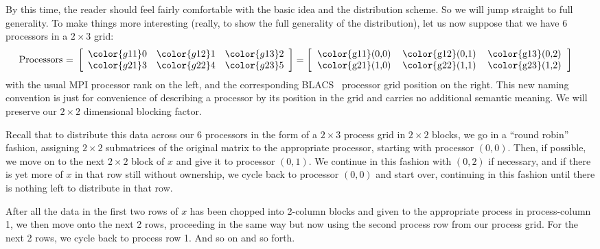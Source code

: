 By this time, the reader should feel fairly comfortable with the basic idea and the distribution scheme.  So we will jump straight to full generality.  To make things more interesting (really, to show the full generality of the distribution), let us now suppose that we have 6 processors in a $2\times 3$ grid:
\begin{align*}
\text{Processors = }
\left[
      \begin{array}{lll}
      \color{g11}0 & \color{g12}1 & \color{g13}2\\
      \color{g21}3 & \color{g22}4 & \color{g23}5
      \end{array}
\right] &= 
\left[
      \begin{tabular}{lll}
      \color{g11}(0,0) & \color{g12}(0,1) & \color{g13}(0,2)\\
      \color{g21}(1,0) & \color{g22}(1,1) & \color{g23}(1,2)
      \end{tabular}
\right]
\end{align*}
with the usual MPI processor rank on the left, and the corresponding
BLACS~ processor grid position on the right.  This new naming convention is just for convenience of describing a processor by its position in the grid and carries no additional semantic meaning.  We will preserve our $2\times 2$ dimensional blocking factor.

Recall that to distribute this data across our 6 processors in the form of a $2\times 3$ process grid in $2\times 2$ blocks, we go in a ``round robin'' fashion, assigning $2\times 2$ submatrices of the original matrix to the appropriate processor, starting with processor $(0, 0)$.  Then, if possible, we move on to the next $2\times 2$ block of $x$ and give it to processor $(0, 1)$.  We continue in this fashion with $(0,2)$ if necessary, and if there is yet more of $x$ in that row still without ownership, we cycle back to processor $(0,0)$ and start over, continuing in this fashion until there is nothing left to distribute in that row.

After all the data in the first two rows of $x$ has been chopped into 2-column blocks and given to the appropriate process in process-column 1, we then move onto the next 2 rows, proceeding in the same way but now using the second process row from our process grid.  For the next 2 rows, we cycle back to process row 1.  And so on and so forth.

